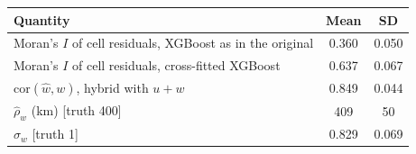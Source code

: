 \begin{tabular}{@{}lcc@{}}
\toprule
Quantity & Mean & SD \\
\midrule
Moran's $I$ of cell residuals, XGBoost as in the original & 0.360 & 0.050 \\
Moran's $I$ of cell residuals, cross-fitted XGBoost & 0.637 & 0.067 \\
$\mathrm{cor}(\hat w, w)$, hybrid with $u + w$ & 0.849 & 0.044 \\
$\hat\rho_w$ (km) [truth 400] & 409 & 50 \\
$\hat\sigma_w$ [truth 1] & 0.829 & 0.069 \\
\bottomrule
\end{tabular}
